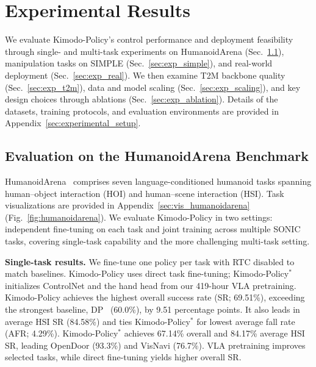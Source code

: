 \section{Experimental Results}
\label{sec:experiments}

We evaluate Kimodo-Policy's control performance and deployment feasibility through single- and multi-task experiments on HumanoidArena (Sec.~\ref{sec:exp_simulation}), manipulation tasks on SIMPLE (Sec.~\ref{sec:exp_simple}), and real-world deployment (Sec.~\ref{sec:exp_real}). We then examine T2M backbone quality (Sec.~\ref{sec:exp_t2m}), data and model scaling (Sec.~\ref{sec:exp_scaling}), and key design choices through ablations (Sec.~\ref{sec:exp_ablation}). Details of the datasets, training protocols, and evaluation environments are provided in Appendix~\ref{sec:experimental_setup}.

\subsection{Evaluation on the HumanoidArena Benchmark}
\label{sec:exp_simulation}

HumanoidArena~\cite{humanoidarena} comprises seven language-conditioned humanoid tasks spanning human--object interaction (HOI) and human--scene interaction (HSI). Task visualizations are provided in Appendix~\ref{sec:vis_humanoidarena} (Fig.~\ref{fig:humanoidarena}). We evaluate Kimodo-Policy in two settings: independent fine-tuning on each task and joint training across multiple SONIC tasks, covering single-task capability and the more challenging multi-task setting.



\begingroup
\setlength{\intextsep}{6pt plus 1pt minus 1pt}
\textbf{Single-task results.} We fine-tune one policy per task with RTC disabled to match baselines. Kimodo-Policy uses direct task fine-tuning; Kimodo-Policy$^{*}$ initializes ControlNet and the hand head from our 419-hour VLA pretraining. Kimodo-Policy achieves the highest overall success rate (SR; 69.51\%), exceeding the strongest baseline, DP~\cite{chi2023diffusionpolicy} (60.0\%), by 9.51 percentage points. It also leads in average HSI SR (84.58\%) and ties Kimodo-Policy$^{*}$ for lowest average fall rate (AFR; 4.29\%). Kimodo-Policy$^{*}$ achieves 67.14\% overall and 84.17\% average HSI SR, leading OpenDoor (93.3\%) and VisNavi (76.7\%). VLA pretraining improves selected tasks, while direct fine-tuning yields higher overall SR.



